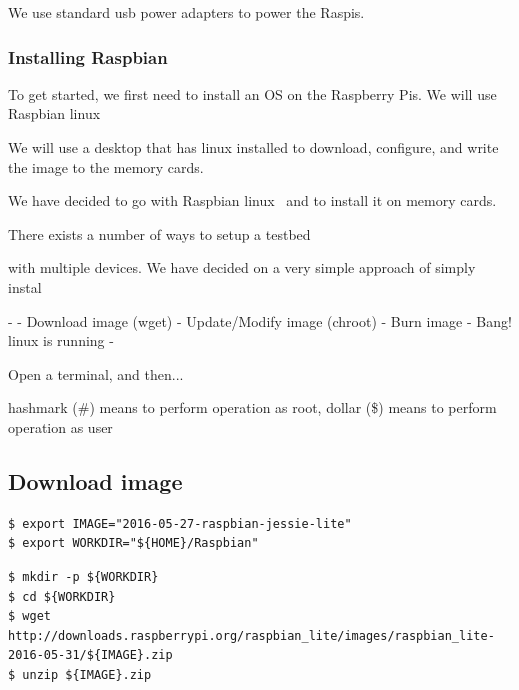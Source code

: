 We use standard usb power adapters to power the \ac{Raspi}s.

\subsubsection{Installing Raspbian}

To get started, we first need to install an \ac{OS} on the
Raspberry Pis. We will use Raspbian linux~\cite{raspbian}

We will use a desktop that has linux installed to download,
configure, and write the image to the memory cards.


We have decided to go with Raspbian linux~\cite{raspbian} and
to install it on memory cards.



There exists a number of ways to setup a testbed

with multiple devices. We
have decided on a very simple approach of simply instal


-
- Download image (wget)
- Update/Modify image (chroot)
- Burn image
- Bang! linux is running
-

Open a terminal, and then...

hashmark (\#) means to perform operation as root, dollar (\$) means to perform operation as user

\subsection{Download image}

\begin{lstlisting}[]
$ export IMAGE="2016-05-27-raspbian-jessie-lite"
$ export WORKDIR="${HOME}/Raspbian"
\end{lstlisting}
\FloatBarrier



\begin{lstlisting}[]
$ mkdir -p ${WORKDIR}
$ cd ${WORKDIR}
$ wget http://downloads.raspberrypi.org/raspbian_lite/images/raspbian_lite-2016-05-31/${IMAGE}.zip
$ unzip ${IMAGE}.zip
\end{lstlisting}
\FloatBarrier

